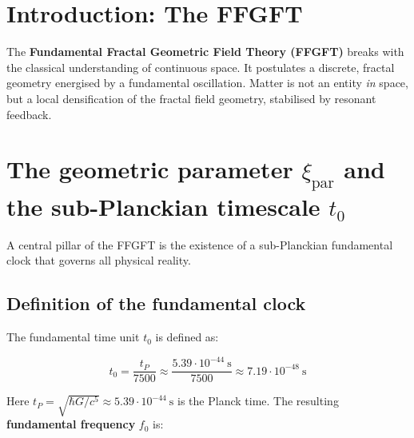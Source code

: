 
	

	\begin{abstract}
		The \textbf{Fundamental Fractal Geometric Field Theory (FFGFT)} describes spacetime as a hierarchical system of fractal convolutions, driven by the fundamental geometric parameter $\xi_{\text{par}} = 4/30000$ and the associated fundamental frequency $f_0 = 1/t_0$ in the sub-Planckian range. This document presents the complete mathematical foundations: the exact definition of the fundamental clock $t_0$, the feedback condition in the closed 4D phase torus (not to be confused with a 3D torus plus time continuum), the translation of the 4D vector space into a multidimensional matrix space, and the photonic realisation via TFLN hardware.
	\end{abstract}
	
	

	\section{Introduction: The FFGFT}
	
	The \textbf{Fundamental Fractal Geometric Field Theory (FFGFT)} breaks with the classical understanding of continuous space. It postulates a discrete, fractal geometry energised by a fundamental oscillation. Matter is not an entity \textit{in} space, but a local densification of the fractal field geometry, stabilised by resonant feedback.
	
	\section{The geometric parameter $\xi_{\text{par}}$ and the sub-Planckian timescale $t_0$}
	
	A central pillar of the FFGFT is the existence of a sub-Planckian fundamental clock that governs all physical reality.
	
	\subsection{Definition of the fundamental clock}
	
	The fundamental time unit $t_0$ is defined as:
	
	\begin{equation}
		t_0 = \frac{t_P}{7500} \approx \frac{5.39 \cdot 10^{-44}~\text{s}}{7500} \approx 7.19 \cdot 10^{-48}~\text{s}
	\end{equation}
	
	Here $t_P = \sqrt{\hbar G/c^5} \approx 5.39 \cdot 10^{-44}~\text{s}$ is the Planck time. The resulting \textbf{fundamental frequency} $f_0$ is:
	
